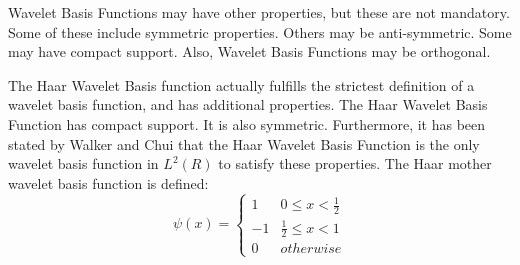 Wavelet Basis Functions may have other properties, but these are not mandatory.  Some of these include symmetric properties.  Others may be anti-symmetric.   Some may have compact support.  Also, Wavelet Basis Functions may be orthogonal.  

The Haar Wavelet Basis function actually fulfills the strictest definition of a wavelet basis function, and has additional properties.  The Haar Wavelet Basis Function has compact support.  It is also symmetric.  Furthermore, it has been stated by Walker\cite{Walker} and  Chui \cite{ChuiIntro} that the Haar Wavelet Basis Function is the only wavelet basis function in $L^2(R)$ to satisfy these properties.  The Haar mother wavelet basis function is defined:
\[ \psi(x) = \left\{\begin{array}{cc}1 & 0\le x < \frac{1}{2} \\-1 & \frac{1}{2} \le x < 1 \\0 & {otherwise}\end{array}\right.  \]










